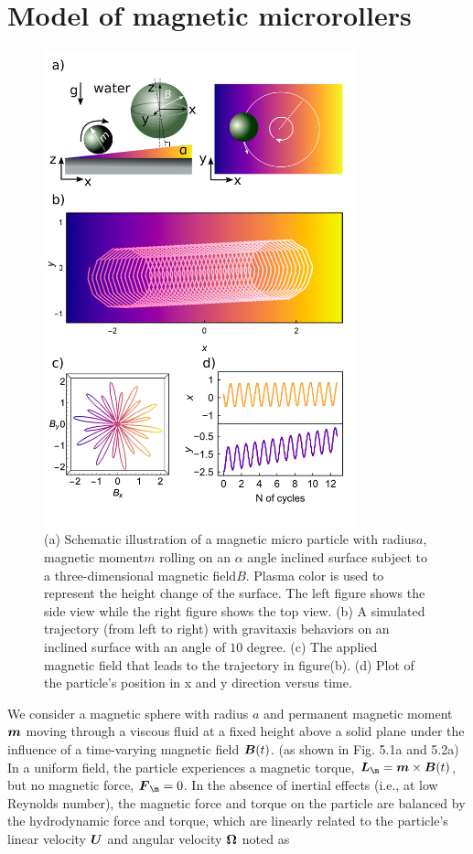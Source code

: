 \section{Model of  magnetic microrollers}
\begin{figure}[p]
\centering
\includegraphics[width=9cm]{figures/5_1.png}
\caption{ (a) Schematic illustration of a magnetic micro particle with radius$a$, magnetic moment$m$ rolling on an $\alpha$ angle inclined surface subject to a three-dimensional magnetic field$B$. Plasma color is used to represent the height change of the surface. The left figure shows the side view while the right figure shows the top view. (b) A simulated trajectory (from left to right) with gravitaxis behaviors on an inclined surface with an angle of $10$ degree. (c) The applied magnetic field that leads to the trajectory in figure(b). (d) Plot of the particle's position in x and y direction versus time.}
\label{fig:5.1}
\end{figure}
We consider a magnetic sphere with radius $a$ and permanent magnetic moment $\boldsymbol{m}$ moving through a viscous fluid at a fixed height above a solid plane under the influence of a time-varying magnetic field $\boldsymbol{B}(t)$. (as shown in Fig. 5.1a and 5.2a) In a uniform field, the particle experiences a magnetic torque, $\ve{L}_{\m}=\ve{m}\times\ve{B}(t)$, but no magnetic force, $\ve{F}_{\m}=0$. In the absence of inertial effects (i.e., at low Reynolds number), the magnetic force and torque on the particle are balanced by the hydrodynamic force and torque, which are linearly related to the particle's linear velocity $\boldsymbol{U}$ and angular velocity $\boldsymbol{\Omega}$ noted as
